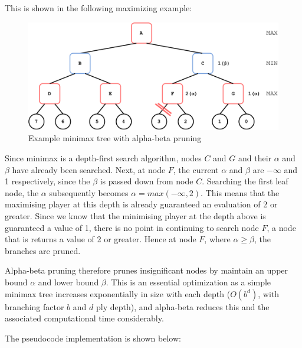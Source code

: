\documentclass[../main/main.tex]{subfiles}
\begin{document}
\noindent This is shown in the following maximizing example:  

\begin{figure}[ht!]
    \centering
    \includegraphics[width=\columnwidth]{../design/assets/alpha_beta_pruning.pdf}
    \caption{Example minimax tree with alpha-beta pruning}
    \label{fig:alpha-beta}
\end{figure}

Since minimax is a depth-first search algorithm, nodes $C$ and $G$ and their $\alpha$ and $\beta$ have already been searched. Next, at node $F$, the current $\alpha$ and $\beta$ are $-\infty$ and 1 respectively, since the $\beta$ is passed down from node $C$. Searching the first leaf node, the $\alpha$ subsequently becomes $\alpha=max(-\infty,2)$. This means that the maximising player at this depth is already guaranteed an evaluation of 2 or greater. Since we know that the minimising player at the depth above is guaranteed a value of 1, there is no point in continuing to search node $F$, a node that is returns a value of 2 or greater. Hence at node $F$, where $\alpha\geq\beta$, the branches are pruned.

Alpha-beta pruning therefore prunes insignificant nodes by maintain an upper bound $\alpha$ and lower bound $\beta$. This is an essential optimization as a simple minimax tree increases exponentially in size with each depth ($O(b^d)$, with branching factor $b$ and $d$ ply depth), and alpha-beta reduces this and the associated computational time considerably.

\noindent The pseudocode implementation is shown below:
\end{document}
